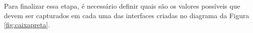 Para finalizar essa etapa, é necessário definir quais são os valores possíveis que devem ser capturados em cada uma das interfaces criadas no diagrama da Figura \ref{fig:caixapreta}.

